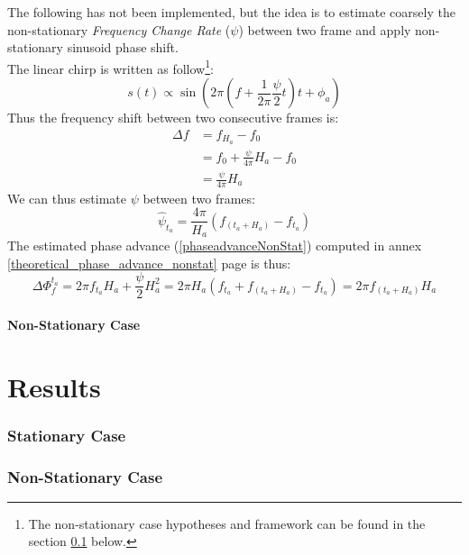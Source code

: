 \documentclass[]{article}
\begin{document}
The following has not been implemented, but the idea is to estimate coarsely the non-stationary \emph{Frequency Change Rate} ($\psi$) between two frame and apply non-stationary sinusoid phase shift.\\
The linear chirp is written as follow\footnote{The non-stationary case hypotheses and framework can be found in the section \ref{non-stationary-case} below.}:
\begin{equation}
s(t) \propto \sin\left(2\pi\left(f  + \frac{1}{2\pi}\frac{\psi}{2} t\right)t + \phi_a\right)
\end{equation}
Thus the frequency shift between two consecutive frames is:
\begin{equation}
\begin{split}
\Delta f & = f_{H_a} - f_0\\
& = f_0 + \frac{\psi}{4\pi}H_a - f_0\\
& = \frac{\psi}{4\pi}H_a
\end{split}
\end{equation}
We can thus estimate $\psi$ between two frames:
\begin{equation}
\hat{\psi}_{t_a} = \frac{4\pi}{H_a}\left(f_{(t_a + H_a)} - f_{t_a} \right)
\end{equation}
The estimated phase advance (\ref{phaseadvanceNonStat}) computed in annex \ref{theoretical_phase_advance_nonstat} page \pageref{theoretical_phase_advance_nonstat} is thus:
\begin{equation}
\Delta \Phi_{f}^{t_a} = 2\pi f_{t_a} H_a + \frac{\psi}{2}H_a^2 = 2\pi H_a\left(f_{t_a} + f_{(t_a + H_a)} - f_{t_a} \right) = 2\pi f_{(t_a + H_a)} H_a
\end{equation}
\subsection{Non-Stationary Case}\label{non-stationary-case}

\newpage
\part{Results}
\section{Stationary Case}\label{sec:stationary-results}
\section{Non-Stationary Case}\label{non-stationary-results}
\end{document}
